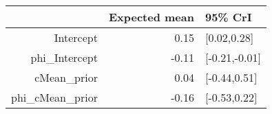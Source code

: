 \begin{tabular}{rrl}
  \hline
 & Expected mean & 95\% CrI \\ 
  \hline
Intercept & 0.15 & [0.02,0.28] \\ 
  phi\_Intercept & -0.11 & [-0.21,-0.01] \\ 
  cMean\_prior & 0.04 & [-0.44,0.51] \\ 
  phi\_cMean\_prior & -0.16 & [-0.53,0.22] \\ 
   \hline
\end{tabular}

